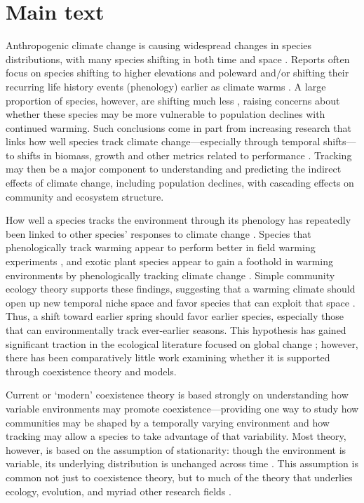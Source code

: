 \documentclass[11pt,letterpaper]{article}
\begin{document}
\section{Main text}
Anthropogenic climate change is causing widespread changes in species distributions, with many species shifting in both time and space \citep{IPCC:2014sm}. Reports often focus on species shifting to higher elevations and poleward \citep{Chen2011} and/or shifting their recurring life history events (phenology) earlier as climate warms \citep{Menzel:2006sq,Wolkovich:2012n,cohen2018}. A large proportion of species, however, are shifting much less \citep{Cook:2012pnas}, raising concerns about whether these species may be more vulnerable to population declines with continued warming. Such conclusions come in part from increasing research that links how well species track climate change---especially through temporal shifts---to shifts in biomass, growth and other metrics related to performance \citep{Cleland:2012}. Tracking may then be a major component to understanding and predicting the indirect effects of climate change, including population declines, with cascading effects on community and ecosystem structure.

How well a species tracks the environment through its phenology has repeatedly been linked to other species' responses to climate change \citep{Cleland:2012,ramula2015}. Species that phenologically track warming appear to perform better in field warming experiments \citep{Cleland:2012}, and exotic plant species appear to gain a foothold in warming environments by phenologically tracking climate change \citep{Willis:2010al}. Simple community ecology theory supports these findings, suggesting that a warming climate should open up new temporal niche space and favor species that can exploit that space \citep{gotelli1996,wolkovich:2010fee,Zettlemoyer2019}. Thus, a shift toward earlier spring should favor earlier species, especially those that can environmentally track ever-earlier seasons. This hypothesis has gained significant traction in the ecological literature focused on global change \citep[e.g.,][]{Cleland:2012}; however, there has been comparatively little work examining whether it is supported through coexistence theory and models. 

Current or `modern' coexistence theory is based strongly on understanding how variable environments may promote coexistence---providing one way to study how communities may be shaped by a temporally varying environment and how tracking may allow a species to take advantage of that variability. Most theory, however, is based on the assumption of stationarity: though the environment is variable, its underlying distribution is unchanged across time \citep[i.e., constant mean and variance][]{barabas2018}. This assumption is common not just to coexistence theory, but to much of the theory that underlies ecology, evolution, and myriad other research fields \citep[e.g.,][]{Milly:2008yu,nosenko2013}. 
\end{document}
